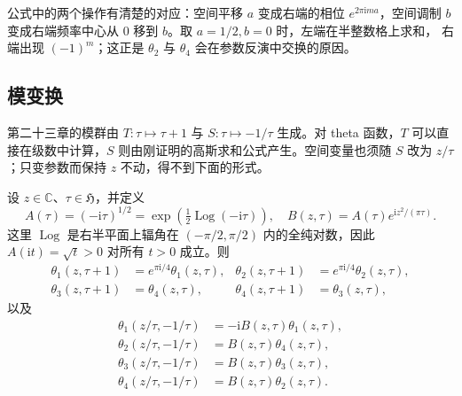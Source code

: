 公式中的两个操作有清楚的对应：空间平移 \(a\) 变成右端的相位
\(e^{2\pi\mathrm ima}\)，空间调制 \(b\) 变成右端频率中心从 \(0\)
移到 \(b\)。取 \(a=1/2,b=0\) 时，左端在半整数格上求和，
右端出现 \((-1)^m\)；这正是 \(\theta_2\) 与 \(\theta_4\) 会在参数反演中交换的原因。

\subsection{模变换}
\label{b3:subsec:240103}

第二十三章的模群由 \(T:\tau\mapsto\tau+1\) 与
\(S:\tau\mapsto-1/\tau\) 生成。对 theta 函数，\(T\) 可以直接在级数中计算，\(S\) 则由刚证明的高斯求和公式产生。空间变量也须随 \(S\) 改为 \(z/\tau\)；只变参数而保持 \(z\) 不动，得不到下面的形式。

\begin{theorem}\label{b3:thm:24-theta-modular}
设 \(z\in\mathbb C\)、\(\tau\in\mathfrak H\)，并定义
\[
 A(\tau)=(-\mathrm i\tau)^{1/2}
   =\exp\left(\tfrac12\operatorname{Log}(-\mathrm i\tau)\right),
 \quad
 B(z,\tau)=A(\tau)e^{\mathrm i z^2/(\pi\tau)}.
\]
这里 \(\operatorname{Log}\) 是右半平面上辐角在
\((-\pi/2,\pi/2)\) 内的全纯对数，因此 \(A(\mathrm it)=\sqrt t>0\)
对所有 \(t>0\) 成立。则
\begin{equation}\label{b3:eq:24-theta-T}
\begin{aligned}
 \theta_1(z,\tau+1)&=e^{\pi\mathrm i/4}\theta_1(z,\tau),&
 \theta_2(z,\tau+1)&=e^{\pi\mathrm i/4}\theta_2(z,\tau),\\
 \theta_3(z,\tau+1)&=\theta_4(z,\tau),&
 \theta_4(z,\tau+1)&=\theta_3(z,\tau),
\end{aligned}
\end{equation}
以及
\begin{equation}\label{b3:eq:24-theta-S}
\begin{aligned}
 \theta_1(z/\tau,-1/\tau)&=-\mathrm iB(z,\tau)\theta_1(z,\tau),\\
 \theta_2(z/\tau,-1/\tau)&=B(z,\tau)\theta_4(z,\tau),\\
 \theta_3(z/\tau,-1/\tau)&=B(z,\tau)\theta_3(z,\tau),\\
 \theta_4(z/\tau,-1/\tau)&=B(z,\tau)\theta_2(z,\tau).
\end{aligned}
\end{equation}
\end{theorem}
